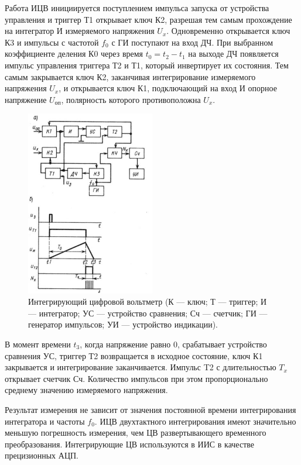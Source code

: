 \documentclass[unicode, 12pt, a4paper, oneside]{article}
\begin{document}
Работа ИЦВ инициируется поступлением импульса запуска от устройства управления и триггер Т1 открывает ключ К2, разрешая тем самым прохождение на интегратор И измеряемого напряжения $U_x$. Одновременно открывается ключ К3 и импульсы с частотой $f_0$ с ГИ поступают на вход ДЧ. При выбранном коэффициенте деления К0 через время $t_0 = t_2 - t_1$ на выходе ДЧ появляется импульс управления триггера Т2 и Т1, который инвертирует их состояния. Тем самым закрывается ключ К2, заканчивая интегрирование измеряемого напряжения $U_x$, и открывается ключ К1, подключающий на вход И опорное напряжение ${U_\text{оп}}$, полярность которого противоположна $U_x$.

\begin{figure}[H]
\centering
\includegraphics[width=0.5\textwidth]{55_2.jpg}
\caption{Интегрирующий цифровой вольтметр (К — ключ; Т — триггер; И — интегратор; УС — устройство сравнения; Сч — счетчик; ГИ — генератор импульсов; УИ — устройство индикации).}
\end{figure}

В момент времени $t_3$, когда напряжение равно 0, срабатывает устройство сравнения УС, триггер Т2 возвращается в исходное состояние, ключ К1 закрывается и интегрирование заканчивается. Импульс T2 с длительностью $T_x$ открывает счетчик Сч. Количество импульсов при этом пропорционально среднему значению измеряемого напряжения.

Результат измерения не зависит от значения постоянной времени интегрирования интегратора и частоты $f_0$.
ИЦВ двухтактного интегрирования имеют значительно меньшую погрешность измерения, чем ЦВ развертывающего временного преобразования. Интегрирующие ЦВ используются в ИИС в качестве прецизионных АЦП.
\end{document}

